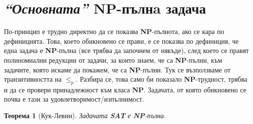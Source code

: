 \documentclass{article}
\newcommand{\NP}{\textbf{NP}}
\theoremstyle{definition}
\theoremstyle{plain}
\newtheorem*{theorem}{Теорема}
\theoremstyle{remark}
\theoremstyle{definition}
\begin{document}
\section*{\textit{``Основната''} \NP-пълнa задача}

По-принцип е трудно директно да се показва \NP-пълнота, ако се кара по дефиницията.
Това, което обикновено се прави, е се показва по дефиниция, че една задача е \NP-пълна (все трябва да започнем от някъде), след което се правят полиномиални редукции от задачи, за които знаем, че са \NP-пълни, към задачите, която искаме да покажем, че са \NP-пълни.
Тук се възползваме от транзитивността на $\leq_p$.
Разбира се, това само би показало \NP-трудност, трябва и да се провери принадлежност към класа \NP.
Задачата, от която обикновено се почва е тази за удовлетворимост/изпълнимост.

\begin{theorem}[Кук-Левин]
    Задачата \textbf{SAT} е \NP-пълна.
\end{theorem}
\end{document}

